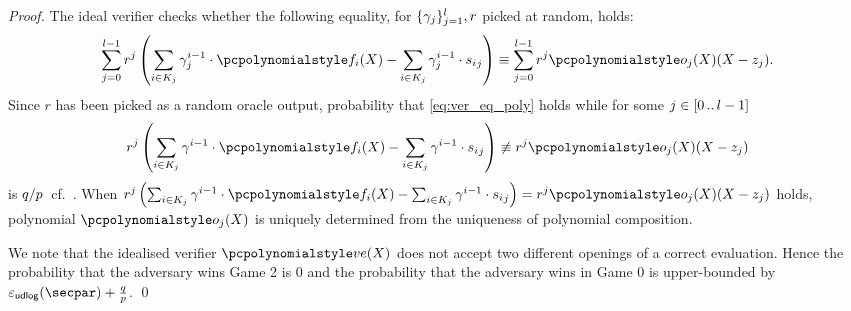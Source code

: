 \begin{proof}
  The ideal verifier checks whether the following equality, for $\{\gamma_j\}_{j = 1}^{l}, r$
  picked at random, holds:
  \begin{multline}
    \label{eq:ver_eq_poly}
    \sum_{j = 0}^{l - 1} r^{j}\left(\sum_{i \in K_j} \gamma_{j}^{i - 1} \cdot \p{f}_i(X) - \sum_{i \in K_j} \gamma_{j}^{i - 1} \cdot {s_i}_j \right) 
    \equiv \sum_{j = 0}^{l - 1} r^{j} \p{o_{j}}(X)(X - z_j).
  \end{multline}
  Since $r$ has been picked as a random oracle output, probability that
  \cref{eq:ver_eq_poly} holds while for some $j \in [0 \, .. \, l - 1]$
  \[
    r^j \left(\sum_{i \in K_j} \gamma^{i - 1} \cdot \p{f}_i(X) - \sum_{i \in K_j}
    \gamma^{i - 1} \cdot {s_i}_j \right) \not\equiv r^j \p{o_j}(X)(X - z_j)
  \]
  is $q / p$~cf.~\cite{EPRINT:GabWilCio19}. 
  When \(
    r^j \left(\sum_{i \in K_j} \gamma^{i - 1} \cdot \p{f}_i(X) - \sum_{i \in K_j}
    \gamma^{i - 1} \cdot {s_i}_j \right) = r^j \p{o_j}(X)(X - z_j)
  \)
  holds, polynomial $\p{o_j}(X)$ is uniquely determined from the uniqueness of
  polynomial composition. 

  We note that the idealised verifier $\vereq(X)$ does not accept two different openings of a correct evaluation. Hence the probability that the adversary wins Game 2 is $0$ and the probability that the adversary wins in Game 0 is upper-bounded by \(\epsudlog (\secpar) + \frac{q}{p}\).
    \qed
\end{proof}